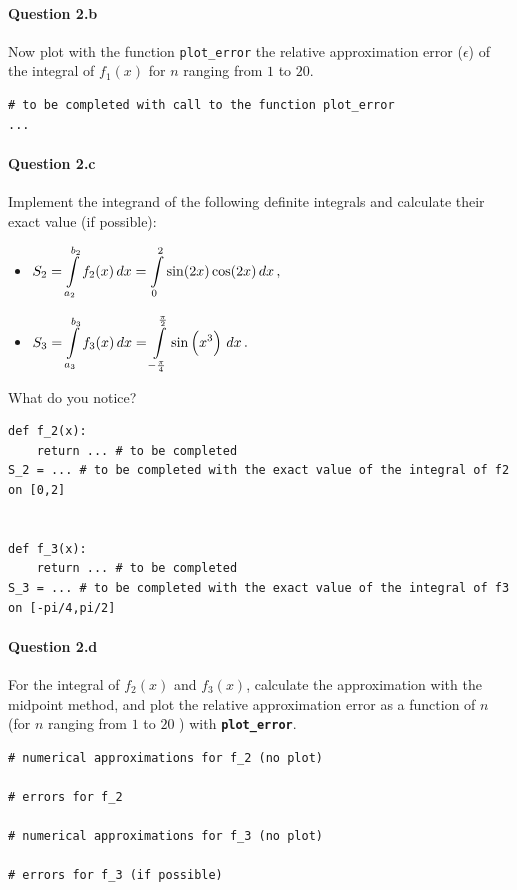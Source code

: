 \paragraph{Question 2.b}
Now plot with the function \lstinline|plot_error| the relative approximation error ($\epsilon$) of the integral of $f_1(x)$ for $n$ ranging from $1$ to $20$.


\begin{lstlisting}
# to be completed with call to the function plot_error
...
\end{lstlisting}


\paragraph{Question 2.c}
Implement the integrand of the following definite integrals and calculate their exact value (if possible):

\begin{itemize}
	\item  $S_2=\displaystyle\int\limits^{b_2}_{a_2}{f_2(x)}\,dx = \displaystyle\int\limits_0^2 \sin(2x)\cos(2x)\,dx\,,$
	\item  $S_3=\displaystyle\int\limits^{b_3}_{a_3}{f_3(x)}\,dx = \displaystyle\int\limits_{-\frac{\pi}{4}}^{\frac{\pi}{2}} \sin\left(x^3\right)\,dx\,.$ 
\end{itemize}

What do you notice?


\begin{lstlisting}
def f_2(x):
	return ... # to be completed
S_2 = ... # to be completed with the exact value of the integral of f2 on [0,2]


def f_3(x):
	return ... # to be completed
S_3 = ... # to be completed with the exact value of the integral of f3 on [-pi/4,pi/2]
\end{lstlisting}


\paragraph{Question 2.d}
For the integral of $f_2(x)$ and $f_3(x)$, calculate the approximation with the midpoint method, and plot the relative approximation error as a function of $n$ (for $n$ ranging from $1$ to $20$ ) with \textbf{\lstinline|plot_error|}.


\begin{lstlisting}
# numerical approximations for f_2 (no plot)

# errors for f_2

# numerical approximations for f_3 (no plot)

# errors for f_3 (if possible)
\end{lstlisting}


